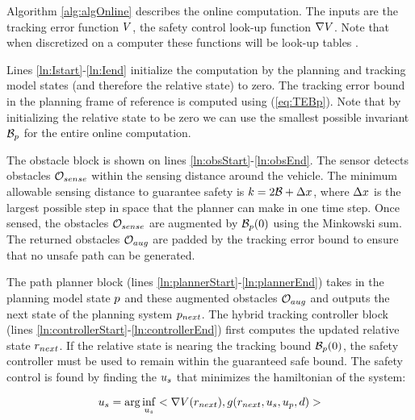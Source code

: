 Algorithm \ref{alg:algOnline} describes the online computation. The inputs are the tracking error function $V$, the safety control look-up function $\nabla V$. Note that when discretized on a computer these functions will be look-up tables . 

Lines \ref{ln:Istart}-\ref{ln:Iend} initialize the computation by the planning and tracking model states (and therefore the relative state) to zero. The tracking error bound in the planning frame of reference is computed using (\ref{eq:TEBp}). Note that by initializing the relative state to be zero we can use the smallest possible invariant $\mathcal B_p$ for the entire online computation. 

The obstacle block is shown on lines \ref{ln:obsStart}-\ref{ln:obsEnd}. The sensor detects obstacles $\mathcal{O}_{sense}$ within the sensing distance around the vehicle. The minimum allowable sensing distance to guarantee safety is $k = 2\mathcal B + \Delta x$, where $\Delta x$ is the largest possible step in space that the planner can make in one time step.  Once sensed, the obstacles $\mathcal{O}_{sense}$ are augmented by $\mathcal B_p(0)$ using the Minkowski sum. The returned obstacles $\mathcal{O}_{aug}$ are padded by the tracking error bound to ensure that no unsafe path can be generated.


 The path planner block (lines \ref{ln:plannerStart}-\ref{ln:plannerEnd}) takes in the planning model state $p$ and these augmented obstacles $\mathcal{O}_{aug}$ and outputs the next state of the planning system $p_{next}$. The hybrid tracking controller block (lines \ref{ln:controllerStart}-\ref{ln:controllerEnd}) first computes the updated relative state $r_{next}$. If the relative state is nearing the tracking bound $\mathcal B_p(0)$, the safety controller must be used to remain within the guaranteed safe bound. The safety control is found by finding the $u_s$ that minimizes the hamiltonian of the system:

\begin{equation}
	u_s = \arg\inf_{u_s} <\nabla V(r_{next}),g(r_{next},u_s,u_p,d)>
\end{equation}

